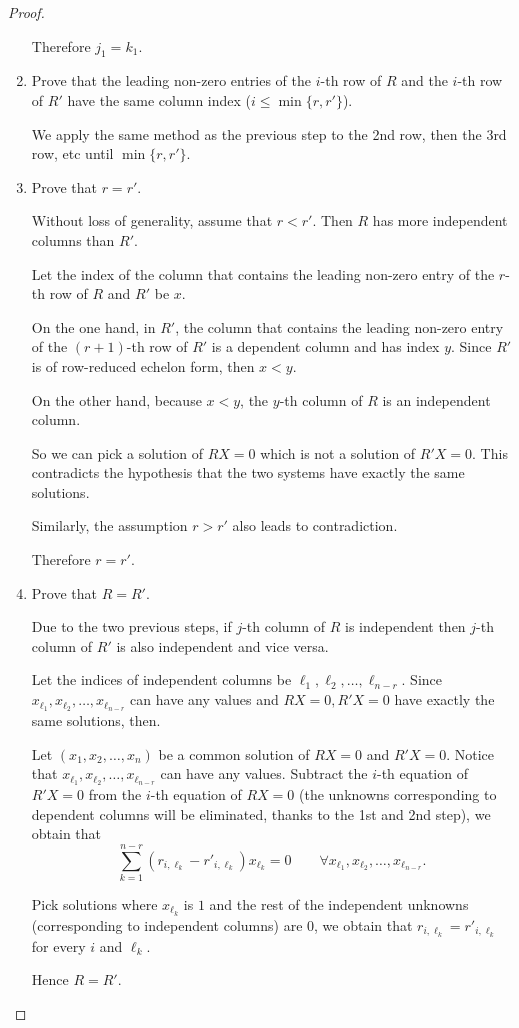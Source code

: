 \begin{proof}
\begin{enumerate}[label={\textbf{Step \arabic*.}},itemindent=0.5cm]
              Therefore $j_{1} = k_{1}$.
        \item Prove that the leading non-zero entries of the $i$-th row of $R$ and the $i$-th row of $R'$ have the same column index ($i \le \min\{ r, r' \}$).

              We apply the same method as the previous step to the 2nd row, then the 3rd row, etc until $\min\{ r, r' \}$.
        \item Prove that $r = r'$.

              Without loss of generality, assume that $r < r'$. Then $R$ has more independent columns than $R'$.

              Let the index of the column that contains the leading non-zero entry of the $r$-th row of $R$ and $R'$ be $x$.

              On the one hand, in $R'$, the column that contains the leading non-zero entry of the $(r+1)$-th row of $R'$ is a dependent column and has index $y$. Since $R'$ is of row-reduced echelon form, then $x < y$.

              On the other hand, because $x < y$, the $y$-th column of $R$ is an independent column.

              So we can pick a solution of $RX = 0$ which is not a solution of $R'X = 0$. This contradicts the hypothesis that the two systems have exactly the same solutions.

              Similarly, the assumption $r > r'$ also leads to contradiction.

              Therefore $r = r'$.
        \item Prove that $R = R'$.

              Due to the two previous steps, if $j$-th column of $R$ is independent then $j$-th column of $R'$ is also independent and vice versa.

              Let the indices of independent columns be $\ell_{1}, \ell_{2}, \ldots, \ell_{n-r}$. Since $x_{\ell_{1}}, x_{\ell_{2}}, \ldots, x_{\ell_{n-r}}$ can have any values and $RX = 0, R'X = 0$ have exactly the same solutions, then.

              Let $(x_{1}, x_{2}, \ldots, x_{n})$ be a common solution of $RX = 0$ and $R'X = 0$. Notice that $x_{\ell_{1}}, x_{\ell_{2}}, \ldots, x_{\ell_{n-r}}$ can have any values. Subtract the $i$-th equation of $R'X = 0$ from the $i$-th equation of $RX = 0$ (the unknowns corresponding to dependent columns will be eliminated, thanks to the 1st and 2nd step), we obtain that
              \[
                  \sum^{n-r}_{k=1}(r_{i,\ell_{k}} - r'_{i,\ell_{k}}) x_{\ell_{k}} = 0\qquad\forall x_{\ell_{1}}, x_{\ell_{2}}, \ldots, x_{\ell_{n-r}}.
              \]

              Pick solutions where $x_{\ell_{k}}$ is $1$ and the rest of the independent unknowns (corresponding to independent columns) are $0$, we obtain that $r_{i,\ell_{k}} = r'_{i,\ell_{k}}$ for every $i$ and $\ell_{k}$.

              Hence $R = R'$.\qedhere
    \end{enumerate}
\end{proof}

